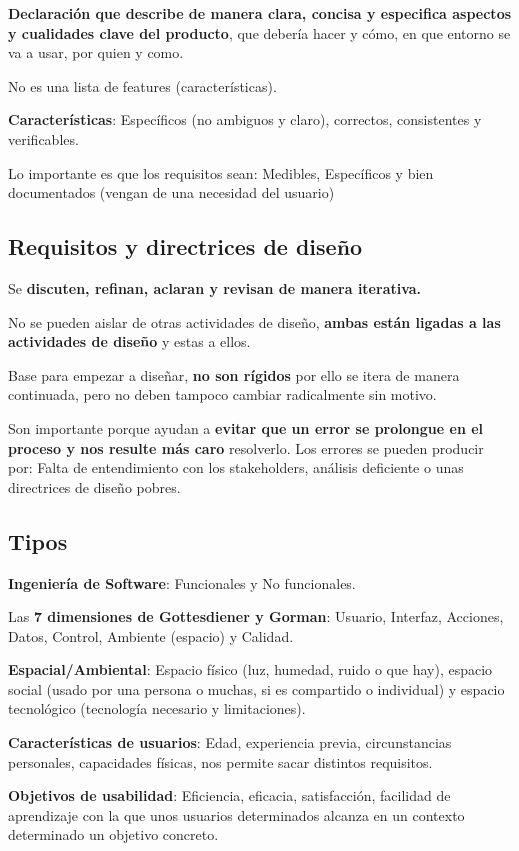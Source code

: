 \documentclass[12pt, twoside, openright]{report} %
\begin{document}
\textbf{Declaración que describe de manera clara, concisa y especifica
	aspectos y cualidades clave del producto}, que debería hacer y cómo, en
que entorno se va a usar, por quien y como.

No es una lista de features (características).

\textbf{Características}: Específicos (no ambiguos y claro), correctos,
consistentes y verificables.

Lo importante es que los requisitos sean: Medibles, Específicos y bien documentados (vengan de una necesidad del usuario)

\subsection{Requisitos y directrices de diseño}

Se \textbf{discuten, refinan, aclaran y revisan de manera iterativa.}

No se pueden aislar de otras actividades de diseño, \textbf{ambas están
	ligadas a las actividades de diseño} y estas a ellos.

Base para empezar a diseñar, \textbf{no son rígidos} por ello se itera
de manera continuada, pero no deben tampoco cambiar radicalmente sin
motivo.

Son importante porque ayudan a \textbf{evitar que un error se prolongue
	en el proceso y nos resulte más caro} resolverlo. Los errores se pueden
producir por: Falta de entendimiento con los stakeholders, análisis
deficiente o unas directrices de diseño pobres.

\subsection{Tipos}

\textbf{Ingeniería de Software}: Funcionales y No funcionales.

Las \textbf{7 dimensiones de Gottesdiener y Gorman}: Usuario, Interfaz,
Acciones, Datos, Control, Ambiente (espacio) y Calidad.

\textbf{Espacial/Ambiental}: Espacio físico (luz, humedad, ruido o que
hay), espacio social (usado por una persona o muchas, si es compartido o
individual) y espacio tecnológico (tecnología necesario y limitaciones).

\textbf{Características de usuarios}: Edad, experiencia previa,
circunstancias personales, capacidades físicas, nos permite sacar
distintos requisitos.

\textbf{Objetivos de usabilidad}: Eficiencia, eficacia, satisfacción,
facilidad de aprendizaje con la que unos usuarios determinados alcanza en
un contexto determinado un objetivo concreto.
\end{document}
